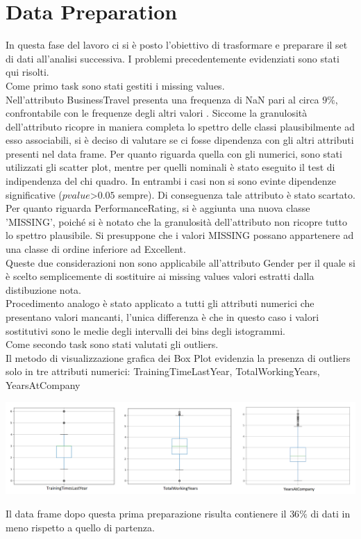 \documentclass[english]{article}
\begin{document}
\section{Data Preparation}
In questa fase del lavoro ci si è posto l'obiettivo di trasformare e preparare il set di dati all'analisi successiva. I problemi precedentemente evidenziati sono stati qui risolti.\\

Come primo task sono stati gestiti i missing values.\\
Nell'attributo BusinessTravel presenta una frequenza di NaN pari al circa $9\%$, confrontabile con le frequenze degli altri valori . Siccome la granulosità dell'attributo ricopre in maniera completa lo spettro delle classi plausibilmente ad esso associabili, si è deciso di valutare se ci fosse dipendenza con gli altri attributi presenti nel data frame. Per quanto riguarda quella con gli numerici, sono stati utilizzati gli scatter plot, mentre per quelli nominali è stato eseguito il test di indipendenza del chi quadro. In entrambi i casi non si sono evinte dipendenze significative ($p value $>$ 0.05$ sempre). Di conseguenza tale attributo è stato scartato.\\

Per quanto riguarda PerformanceRating, si è aggiunta una nuova classe 'MISSING', poiché si è notato che la granulosità dell'attributo non ricopre tutto lo spettro plausibile. Si presuppone che i valori MISSING possano appartenere ad una classe di ordine inferiore ad Excellent.\\

Queste due considerazioni non sono applicabile all'attributo Gender per il quale si è scelto semplicemente di sostituire ai missing values valori estratti dalla distibuzione nota.\\

Procedimento analogo è stato applicato a tutti gli attributi numerici che presentano valori mancanti, l'unica differenza è che in questo caso i valori sostitutivi sono le medie degli intervalli dei bins degli istogrammi.\\ %

Come secondo task sono stati valutati gli outliers.\\
Il metodo di visualizzazione grafica dei Box Plot evidenzia la presenza di outliers solo in tre attributi numerici: TrainingTimeLastYear, TotalWorkingYears, YearsAtCompany
\begin{center}
\includegraphics[scale=1]{boxplot.png}
\end{center}
 Il data frame dopo questa prima preparazione risulta contienere il $36\%$ di dati in meno rispetto a quello di partenza.\\
\end{document}
